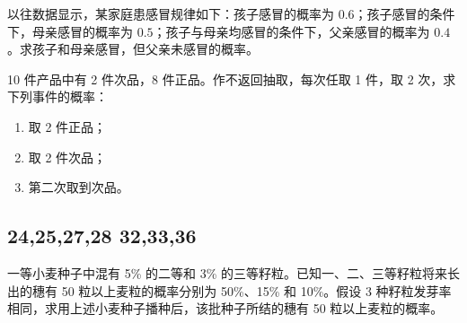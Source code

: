 \begin{exercise}
以往数据显示，某家庭患感冒规律如下：孩子感冒的概率为 $0.6$；孩子感冒的条件下，母亲感冒的概率为 $0.5$；孩子与母亲均感冒的条件下，父亲感冒的概率为 $0.4$。求孩子和母亲感冒，但父亲未感冒的概率。
\end{exercise}

\begin{exercise}
10 件产品中有 2 件次品，8 件正品。作不返回抽取，每次任取 1 件，取 2 次，求下列事件的概率：
\begin{enumerate}
  \item 取 2 件正品；
  \item 取 2 件次品；
  \item 第二次取到次品。
\end{enumerate}
\end{exercise}
\subsection{24,25,27,28 32,33,36}
\begin{exercise}
一等小麦种子中混有 5\% 的二等和 3\% 的三等籽粒。已知一、二、三等籽粒将来长出的穗有 50 粒以上麦粒的概率分别为 50\%、15\% 和 10\%。假设 3 种籽粒发芽率相同，求用上述小麦种子播种后，该批种子所结的穗有 50 粒以上麦粒的概率。
\end{exercise}

